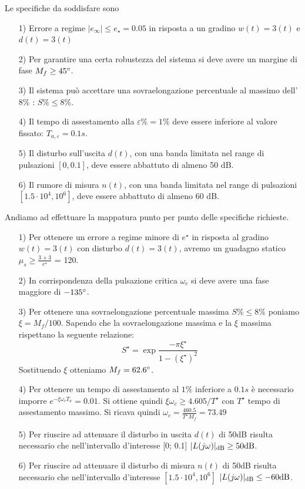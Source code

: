 \documentclass[a4paper, 11pt]{article}
\begin{document}
	Le specifiche da soddisfare sono
	\begin{itemize}
		\item[1)] Errore a regime $|e_\infty| \le e_\star = 0.05$ in risposta a un gradino $w(t) = 3(t)$ e $d(t) = 3(t)$
		\item[2)] Per garantire una certa robustezza del sistema si deve avere un margine di fase $M_f \ge 45\degree$.
		\item[3)] Il sistema può accettare una sovraelongazione percentuale al massimo dell’$8\%$ : $S\% \le 8\%$.
		\item[4)]  Il tempo di assestamento alla $\varepsilon\% = 1\%$ deve essere inferiore al valore fissato: $T_{a,\varepsilon} = 0.1s$.
		\item[5)]  Il disturbo sull’uscita $d(t)$, con una banda limitata nel range di pulsazioni $[0, 0.1]$, deve essere abbattuto di almeno 50 dB.
		\item[6)]  Il rumore di misura $n(t)$, con una banda limitata nel range di pulsazioni $[1.5\cdot10^4 , 10^6]$, deve essere
		abbattuto di almeno 60 dB.
	\end{itemize}
	Andiamo ad effettuare la mappatura punto per punto delle specifiche richieste.
	\begin{itemize}
		\item[1)] Per ottenere un errore a regime minore di $e^\star$ in risposta al gradino $w(t) = 3(t)$ con disturbo $d(t) = 3(t)$, avremo un guadagno statico $\mu_s \ge \frac{3 + 3}{e^\star}$ = 120.
		\item[2)] In corrispondenza della pulsazione critica $\omega_c$ si deve avere una fase maggiore di $-135\degree$.
		\item[3)] Per ottenere una sovraelongazione percentuale massima $S\% \le 8\%$ poniamo $\xi = M_f/100.$ Sapendo che la sovraelongazione massima e la $\xi$ massima rispettano la seguente relazione:\[
		S^\star = \exp{\frac{-\pi\xi^\star}{1-(\xi^\star)^2}}
		\]
		Sostituendo $\xi$ otteniamo $M_f = 62.6\degree$.
		\item[4)] Per ottenere un tempo di assestamento al $1\%$ inferiore a $0.1s$ è necessario imporre $e^{-\xi\omega_c T_a} = 0.01$.
		Si ottiene quindi $\xi\omega_c \ge 4.605/T^\star$ con $T^\star$ tempo di assestamento massimo.
		Si ricava quindi $\omega_c=\frac{460.5}{T^\star M_f}=73.49$
		\item[5)] Per riuscire ad attenuare il disturbo in uscita $d(t)$ di 50dB risulta necessario che nell’intervallo
		d’interesse [0; 0.1] $|L(j\omega)|_{\text{dB}} \ge 50\text{dB}$.
		\item[6)] Per riuscire ad attenuare il disturbo di misura $n(t)$ di 50dB risulta necessario che nell’intervallo
		d’interesse $[1.5\cdot10^4 , 10^6]$ $|L(j\omega)|_{\text{dB}} \le -60\text{dB}$.
		
	\end{itemize}  
	
\end{document}
